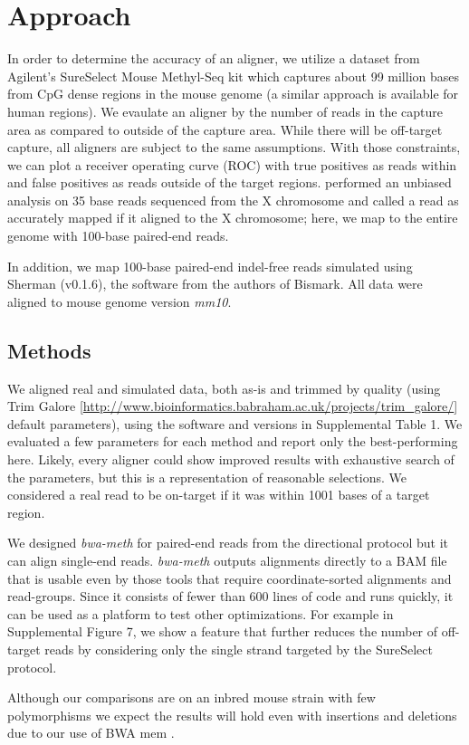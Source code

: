 \documentclass{bioinfo}
\begin{document}
\section{Approach}
In order to determine the accuracy of an aligner,
we utilize a dataset from Agilent's SureSelect Mouse Methyl-Seq kit which
captures about
99 million bases from CpG dense regions in the mouse genome (a similar
approach is available for human regions).
We evaulate an aligner by the number of reads in the capture area as compared
to outside of the capture area. While there will be off-target capture, all
aligners are subject to the same assumptions. With those constraints, we can
plot a receiver operating curve (ROC) with true positives as reads within
and false positives as reads outside of the target regions.
\citealp{shrestha} performed an unbiased analysis on 35 base reads sequenced from
the X chromosome and called a read as accurately mapped if it aligned
to the X chromosome; here, we map to the entire genome with 100-base paired-end reads.

In addition, we map 100-base paired-end indel-free reads simulated using
Sherman (v0.1.6), the software from the authors of Bismark. All data were
aligned to mouse genome version \textit{mm10}.

\begin{methods}
\section{Methods}
We aligned real and simulated data, both as-is and trimmed by quality (using Trim Galore
[\href{http://www.bioinformatics.babraham.ac.uk/projects/trim\_galore/}{http://www.bioinformatics.babraham.ac.uk/projects/trim\_galore/}]
default parameters), using the software and versions in Supplemental Table 1.
We evaluated a few parameters for each method and report only the
best-performing here. Likely, every aligner could show improved results with
exhaustive search of the parameters, but this is a representation of
reasonable selections.
We considered a real read to be on-target if it was within 1001 bases
of a target region.

We designed \textit{bwa-meth} for paired-end reads from the directional
protocol but it can align single-end reads. \textit{bwa-meth} outputs alignments
directly to a BAM file that is usable even by those tools that require
coordinate-sorted alignments and read-groups. Since it consists
of fewer than 600 lines of code and runs
quickly, it can be used as a platform to test other optimizations. For example
in Supplemental Figure 7, we show a feature that further reduces the
number of off-target reads by considering only the single strand targeted by
the SureSelect protocol.

Although our comparisons are on an inbred mouse strain with few polymorphisms
we expect the results will hold even with insertions and deletions due to
our use of BWA mem \citep{bwamem}.

\end{methods}
\end{document}
